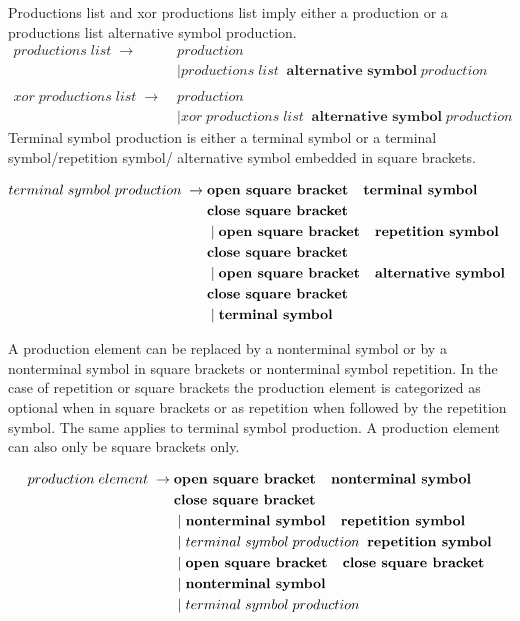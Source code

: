 Productions list and xor productions list imply either a production or a productions list alternative symbol production.
\begin{align*}
        productions\;list\; \rightarrow\; &production \\
               &\mid productions\;list\;\;\textbf{alternative symbol} \;production \\ \\                  
        xor\;productions\;list\; \rightarrow\; &production \\
               &\mid xor\;productions\;list\;\;\textbf{alternative symbol}\;production
\end{align*}
Terminal symbol production is either a terminal symbol or a terminal symbol/repetition symbol/ alternative symbol embedded in square brackets.

\begin{align*}
	terminal\;symbol\;production\; \rightarrow\; & \textbf{open square bracket \; terminal symbol} \\ &\textbf{close square bracket}\\
               &\mid \textbf{open square bracket \; repetition symbol} \\ &\textbf{close square bracket}\\
               &\mid \textbf{open square bracket \; alternative symbol } \\ &\textbf{close square bracket}\\
               &\mid \textbf{terminal symbol} 
\end{align*}

A production element can be replaced by a nonterminal symbol or by a nonterminal symbol in square brackets or nonterminal symbol repetition. In the case of repetition or square brackets the production element is categorized as optional when in square brackets or as repetition when followed by the repetition symbol. The same applies to terminal symbol production. A production element can also only be square brackets only.

\begin{align*}
	production\;element\; \rightarrow\; & \textbf{open square bracket \; nonterminal symbol} \\ 
			   &\textbf{close square bracket}\\
               &\mid \textbf{nonterminal symbol \; repetition symbol} \\
               &\mid terminal\;symbol\;production\;\; \textbf{repetition symbol} \\
               &\mid \textbf{open square bracket \; close square bracket} \\
               &\mid \textbf{nonterminal symbol} \\
               &\mid terminal\; symbol\; production 
\end{align*}

